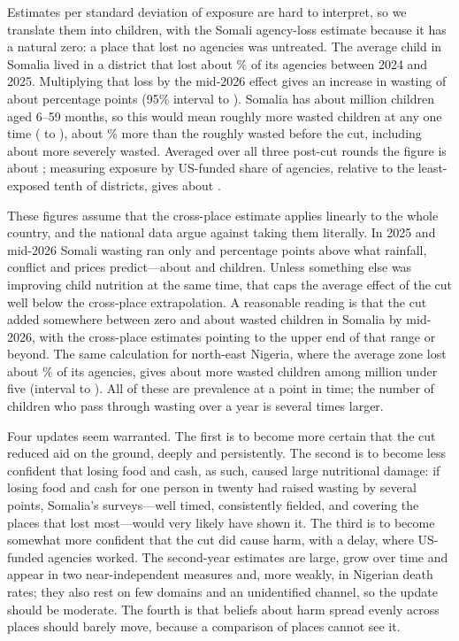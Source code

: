 \documentclass[11pt]{article}
\newcommand{\sh}[1]{\par\medskip{\sffamily\bfseries #1}\par}
\begin{document}
\sh{How large would the effects be?}

Estimates per standard deviation of exposure are hard to interpret, so we translate them into children, with the Somali agency-loss estimate because it has a natural zero: a place that lost no agencies was untreated. The average child in Somalia lived in a district that lost about \nscSomLoss\% of its agencies between 2024 and 2025. Multiplying that loss by the mid-2026 effect gives an increase in wasting of about \nscSomPpLossTs{} percentage points (95\% interval \nscSomPpLoLossTs{} to \nscSomPpHiLossTs). Somalia has about \nscSomKids{} million children aged 6--59 months, so this would mean roughly \nscSomKidsLossTs{} more wasted children at any one time (\nscSomKidsLoLossTs{} to \nscSomKidsHiLossTs), about \nscSomPctIncLossTs\% more than the roughly \nscSomBaseWasted{} wasted before the cut, including about \nscSomKidsLossTsSam{} more severely wasted. Averaged over all three post-cut rounds the figure is about \nscSomKidsLossPool{}; measuring exposure by US-funded share of agencies, relative to the least-exposed tenth of districts, gives about \nscSomKidsUsTs.

These figures assume that the cross-place estimate applies linearly to the whole country, and the national data argue against taking them literally. In 2025 and mid-2026 Somali wasting ran only \nscSomPpNatTv{} and \nscSomPpNatTs{} percentage points above what rainfall, conflict and prices predict---about \nscSomKidsNatTv{} and \nscSomKidsNatTs{} children. Unless something else was improving child nutrition at the same time, that caps the average effect of the cut well below the cross-place extrapolation. A reasonable reading is that the cut added somewhere between zero and about \nscSomKidsNatTs{} wasted children in Somalia by mid-2026, with the cross-place estimates pointing to the upper end of that range or beyond. The same calculation for north-east Nigeria, where the average zone lost about \nscNgaLoss\% of its agencies, gives about \nscNgaKidsPool{} more wasted children among \nscNgaKids{} million under five (interval \nscNgaKidsLoPool{} to \nscNgaKidsHiPool). All of these are prevalence at a point in time; the number of children who pass through wasting over a year is several times larger.

\sh{What to believe}

Four updates seem warranted. The first is to become more certain that the cut reduced aid on the ground, deeply and persistently. The second is to become less confident that losing food and cash, as such, caused large nutritional damage: if losing food and cash for one person in twenty had raised wasting by several points, Somalia's surveys---well timed, consistently fielded, and covering the places that lost most---would very likely have shown it. The third is to become somewhat more confident that the cut did cause harm, with a delay, where US-funded agencies worked. The second-year estimates are large, grow over time and appear in two near-independent measures and, more weakly, in Nigerian death rates; they also rest on few domains and an unidentified channel, so the update should be moderate. The fourth is that beliefs about harm spread evenly across places should barely move, because a comparison of places cannot see it.
\end{document}
